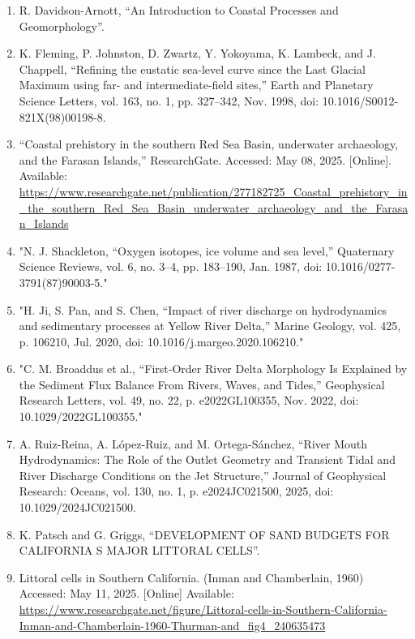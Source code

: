 \documentclass{article}
\begin{document}
\begin{sloppypar}
\begin{enumerate}
    \item{R. Davidson-Arnott, “An Introduction to Coastal Processes and Geomorphology”.}

    \item{K. Fleming, P. Johnston, D. Zwartz, Y. Yokoyama, K. Lambeck, and J. Chappell, “Refining the eustatic sea-level curve since the Last Glacial Maximum using far- and intermediate-field sites,” Earth and Planetary Science Letters, vol. 163, no. 1, pp. 327–342, Nov. 1998, doi: 10.1016/S0012-821X(98)00198-8.}

    \item{“Coastal prehistory in the southern Red Sea Basin, underwater archaeology, and the Farasan Islands,” ResearchGate. Accessed: May 08, 2025. [Online]. Available: \url{https://www.researchgate.net/publication/277182725_Coastal_prehistory_in_the_southern_Red_Sea_Basin_underwater_archaeology_and_the_Farasan_Islands}}

    \item{"N. J. Shackleton, “Oxygen isotopes, ice volume and sea level,” Quaternary Science Reviews, vol. 6, no. 3–4, pp. 183–190, Jan. 1987, doi: 10.1016/0277-3791(87)90003-5."}

    \item{"H. Ji, S. Pan, and S. Chen, “Impact of river discharge on hydrodynamics and sedimentary processes at Yellow River Delta,” Marine Geology, vol. 425, p. 106210, Jul. 2020, doi: 10.1016/j.margeo.2020.106210."}

    \item{"C. M. Broaddus et al., “First‐Order River Delta Morphology Is Explained by the Sediment Flux Balance From Rivers, Waves, and Tides,” Geophysical Research Letters, vol. 49, no. 22, p. e2022GL100355, Nov. 2022, doi: 10.1029/2022GL100355."}

    \item{A. Ruiz-Reina, A. López-Ruiz, and M. Ortega-Sánchez, “River Mouth Hydrodynamics: The Role of the Outlet Geometry and Transient Tidal and River Discharge Conditions on the Jet Structure,” Journal of Geophysical Research: Oceans, vol. 130, no. 1, p. e2024JC021500, 2025, doi: 10.1029/2024JC021500.}

    \item{K. Patsch and G. Griggs, “DEVELOPMENT OF SAND BUDGETS FOR CALIFORNIA S MAJOR LITTORAL CELLS”.}

    \item{Littoral cells in Southern California. (Inman and Chamberlain, 1960) Accessed: May 11, 2025. [Online] Available: \url{https://www.researchgate.net/figure/Littoral-cells-in-Southern-California-Inman-and-Chamberlain-1960-Thurman-and_fig4_240635473}}


\end{enumerate}
\end{sloppypar}
\end{document}
